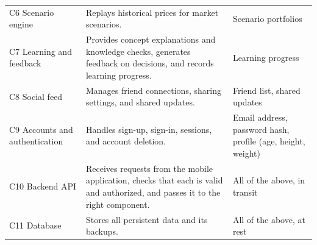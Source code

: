 \documentclass{article}
\begin{document}
\begin{table}[H]
\begin{tabularx}{\textwidth}{>{\raggedright\arraybackslash}p{}
    X >{\raggedright\arraybackslash}p{}}
    C6 Scenario engine                                                           & Replays historical prices for market scenarios.            &
    Scenario portfolios                                                                                                                                                \\
    C7 Learning and feedback                                                     & Provides concept explanations and knowledge checks,
    generates feedback on decisions, and records learning progress.              & Learning
    progress                                                                                                                                                           \\
    C8 Social feed                                                               & Manages friend connections, sharing settings, and shared
    updates.                                                                     & Friend list, shared updates                                                         \\
    C9 Accounts and authentication                                               & Handles sign-up, sign-in, sessions, and
    account deletion.                                                            & Email address, password hash, profile (age, height,
    weight)                                                                                                                                                            \\
    C10 Backend API                                                              & Receives requests from the mobile application, checks that
    each is valid and authorized, and passes it to the right component.          & All of
    the above, in transit                                                                                                                                              \\
    C11 Database                                                                 & Stores all persistent data and its backups.                & All of the above,
    at rest                                                                                                                                                            \\
    \bottomrule
  \end{tabularx}
\end{table}
\end{document}
